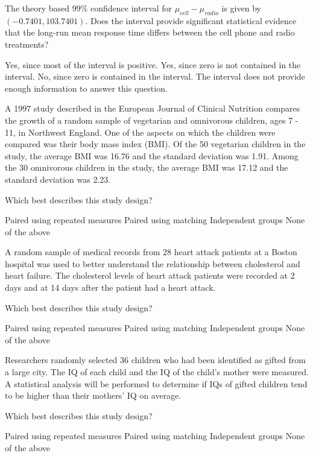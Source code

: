 \documentclass{article}
\begin{document}
\begin{mcquestions}
		\question The theory based 99\% confidence interval for $\mu_{{cell}}-\mu_{{radio}}$ is given by $(-0.7401,103.7401)$. Does the interval provide significant statistical evidence that the long-run mean response time differs between the cell phone and radio treatments?
		\begin{mcanswerslist}
			\answer Yes, since most of the interval is positive.
			\answer Yes, since zero is not contained in the interval.
			\answer[correct] No, since zero is contained in the interval.
			\answer The interval does not provide enough information to answer this question.
		\end{mcanswerslist}
		
		\question A 1997 study described in the European Journal of Clinical Nutrition compares the growth of a random sample of vegetarian and omnivorous children, ages 7 - 11, in Northwest England. One of the aspects on which the children were compared was their body mass index (BMI). Of the 50 vegetarian children in the study, the average BMI was 16.76 and the standard deviation was 1.91. Among the 30 omnivorous children in the study, the average BMI was 17.12 and the standard deviation was 2.23.
		
		Which best describes this study design?
		\begin{mcanswerslist}
			\answer Paired using repeated measures
			\answer Paired using matching
			\answer[correct] Independent groups
			\answer None of the above
		\end{mcanswerslist}
		
		\question A random sample of medical records from 28 heart attack patients at a Boston hospital was used to better understand the relationship between cholesterol and heart failure.  The cholesterol levels of heart attack patients were recorded at 2 days and at 14 days after the patient had a heart attack.
		
		Which best describes this study design?
		\begin{mcanswerslist}
			\answer[correct] Paired using repeated measures
			\answer Paired using matching
			\answer Independent groups
			\answer None of the above
		\end{mcanswerslist}
		
		\question Researchers randomly selected 36 children who had been identified as gifted from a large city. The IQ of each child and the IQ of the child's mother were measured. A statistical analysis will be performed to determine if IQs of gifted children tend to be higher than their mothers' IQ on average.
		
		Which best describes this study design?
		
		\begin{mcanswerslist}
			\answer Paired using repeated measures
			\answer[correct] Paired using matching
			\answer Independent groups
			\answer None of the above
		\end{mcanswerslist}
	\end{mcquestions}
\end{document}
